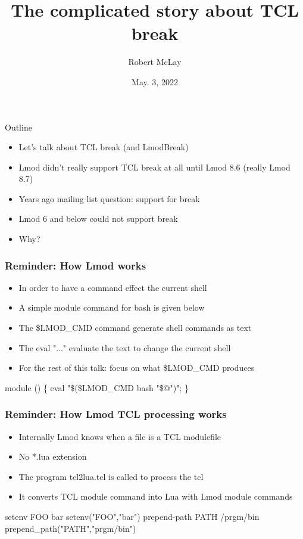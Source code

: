 \documentclass{beamer}
\begin{document}
\title[Lmod]{The complicated story about TCL break}
\author{Robert McLay} 
\date{May. 3, 2022}

\frame{\titlepage} 


\begin{frame}{Outline}
  \begin{itemize}
    \item Let's talk about TCL break (and LmodBreak)
    \item Lmod didn't really support TCL break at all until Lmod 8.6
      (really Lmod 8.7)
    \item Years ago mailing list question: support for break
    \item Lmod 6 and below could not support break
    \item Why?
  \end{itemize}
\end{frame}

\begin{frame}[fragile]
    \frametitle{Reminder: How Lmod works}
  \begin{itemize}
    \item In order to have a command effect the current shell
    \item A simple module command for bash is given below
    \item The \$LMOD\_CMD command generate shell commands as text
    \item The eval "..." evaluate the text to change the current shell
    \item For the rest of this talk: focus on what \$LMOD\_CMD produces
  \end{itemize}
 {\small
    \begin{semiverbatim}
     module () \{ eval "\$(\$LMOD\_CMD bash "\$@")"; \}
    \end{semiverbatim}
}
\end{frame}

\begin{frame}[fragile]
    \frametitle{Reminder: How Lmod TCL processing works}
  \begin{itemize}
    \item Internally Lmod knows when a file is a TCL modulefile 
    \item No *.lua extension
    \item The program tcl2lua.tcl is called to process the tcl 
    \item It converts TCL module command into Lua with Lmod module
      commands
  \end{itemize}
 {\small
    \begin{semiverbatim}
setenv FOO bar \Rightarrow setenv("FOO","bar")
prepend-path PATH /prgm/bin \Rightarrow prepend_path("PATH","prgm/bin")
    \end{semiverbatim}
}
\end{frame}
\end{document}
